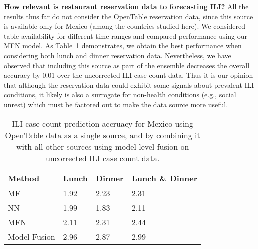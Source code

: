 

{\noindent \textbf{How relevant is restaurant reservation data to forecasting ILI?}} 
All the results thus far do not consider the OpenTable reservation data, since this source is available only for
Mexico (among the countries studied here). We considered table availability for different time ranges and compared
performance using our MFN model. As Table~\ref{tb:opentable} demonstrates, we obtain the best performance when
considering both lunch and dinner reservation data. Nevertheless, we have observed that including this source
as part of the ensemble decreases the overall accuracy by 0.01 over the uncorrected ILI case count data.
Thus it is our opinion that although the reservation data could exhibit some signals about prevalent ILI
conditions, it likely is also a surrogate for non-health conditions (e.g., social unrest) which must be factored
out to make the data source more useful.

\begin{table}[H]
  \scriptsize
\centering
\captionsetup{font=scriptsize}
\caption{\label{tb:opentable}  ILI case count prediction accruacy for Mexico using OpenTable data as a single source, and
by combining it with all other sources using model level fusion on uncorrected ILI case count data.}
\vspace{-1em}
\begin{tabular}{|p{1.5cm}|*{2}{l|}p{2cm}|}
\hline
Method& Lunch & Dinner & Lunch \& Dinner \\
\hline \hline
MF   & 1.92 & 2.23 & 2.31 \\
NN   & 1.99 & 1.83 & 2.11 \\
MFN  & 2.11 & 2.31 & 2.44 \\
Model Fusion & 2.96 & 2.87 & 2.99 \\
\hline
\end{tabular}
\end{table}

